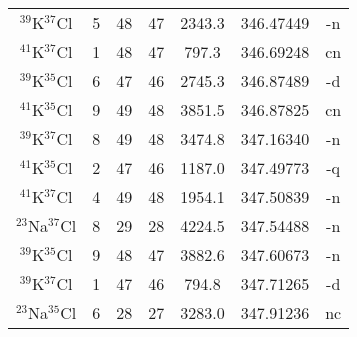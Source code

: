 \begin{table*}[htp]
\begin{tabular}{ccccccc}
$^{39}$K$^{37}$Cl & 5 & 48 & 47 & 2343.3 & 346.47449 & -n \\
$^{41}$K$^{37}$Cl & 1 & 48 & 47 & 797.3 & 346.69248 & cn \\
$^{39}$K$^{35}$Cl & 6 & 47 & 46 & 2745.3 & 346.87489 & -d \\
$^{41}$K$^{35}$Cl & 9 & 49 & 48 & 3851.5 & 346.87825 & cn \\
$^{39}$K$^{37}$Cl & 8 & 49 & 48 & 3474.8 & 347.16340 & -n \\
$^{41}$K$^{35}$Cl & 2 & 47 & 46 & 1187.0 & 347.49773 & -q \\
$^{41}$K$^{37}$Cl & 4 & 49 & 48 & 1954.1 & 347.50839 & -n \\
$^{23}$Na$^{37}$Cl & 8 & 29 & 28 & 4224.5 & 347.54488 & -n \\
$^{39}$K$^{35}$Cl & 9 & 48 & 47 & 3882.6 & 347.60673 & -n \\
$^{39}$K$^{37}$Cl & 1 & 47 & 46 & 794.8 & 347.71265 & -d \\
$^{23}$Na$^{35}$Cl & 6 & 28 & 27 & 3283.0 & 347.91236 & nc \\
\hline
\end{tabular}

\par 
\end{table*}
